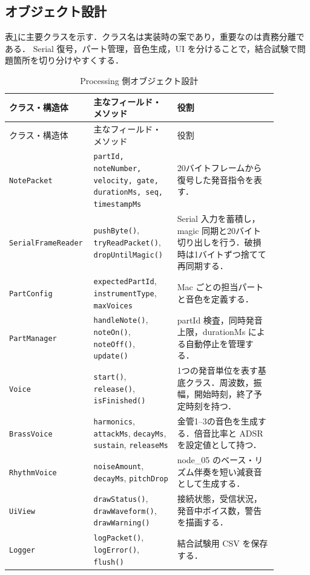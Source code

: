 \documentclass[lualatex,book,openany,paper=a4paper,jafontsize=11.5pt,jafontscale=1.05]{jlreq}
\begin{document}
\subsection{オブジェクト設計}
表\ref{tab:classes}に主要クラスを示す．クラス名は実装時の案であり，重要なのは責務分離である．
Serial 復号，パート管理，音色生成，UI を分けることで，結合試験で問題箇所を切り分けやすくする．

\begin{longtable}{p{0.22\linewidth}p{0.30\linewidth}p{0.36\linewidth}}
\caption{Processing 側オブジェクト設計}\label{tab:classes}\\
\hline
クラス・構造体 & 主なフィールド・メソッド & 役割 \\
\hline
\endfirsthead
\hline
クラス・構造体 & 主なフィールド・メソッド & 役割 \\
\hline
\endhead
\texttt{NotePacket} &
\texttt{partId, noteNumber, velocity, gate, durationMs, seq, timestampMs} &
20バイトフレームから復号した発音指令を表す． \\
\hline
\texttt{SerialFrameReader} &
\texttt{pushByte()}, \texttt{tryReadPacket()}, \texttt{dropUntilMagic()} &
Serial 入力を蓄積し，magic 同期と20バイト切り出しを行う．破損時は1バイトずつ捨てて再同期する． \\
\hline
\texttt{PartConfig} &
\texttt{expectedPartId}, \texttt{instrumentType}, \texttt{maxVoices} &
Mac ごとの担当パートと音色を定義する． \\
\hline
\texttt{PartManager} &
\texttt{handleNote()}, \texttt{noteOn()}, \texttt{noteOff()}, \texttt{update()} &
partId 検査，同時発音上限，durationMs による自動停止を管理する． \\
\hline
\texttt{Voice} &
\texttt{start()}, \texttt{release()}, \texttt{isFinished()} &
1つの発音単位を表す基底クラス．周波数，振幅，開始時刻，終了予定時刻を持つ． \\
\hline
\texttt{BrassVoice} &
\texttt{harmonics}, \texttt{attackMs}, \texttt{decayMs}, \texttt{sustain}, \texttt{releaseMs} &
金管1--3の音色を生成する．倍音比率と ADSR を設定値として持つ． \\
\hline
\texttt{RhythmVoice} &
\texttt{noiseAmount}, \texttt{decayMs}, \texttt{pitchDrop} &
node\_05 のベース・リズム伴奏を短い減衰音として生成する． \\
\hline
\texttt{UiView} &
\texttt{drawStatus()}, \texttt{drawWaveform()}, \texttt{drawWarning()} &
接続状態，受信状況，発音中ボイス数，警告を描画する． \\
\hline
\texttt{Logger} &
\texttt{logPacket()}, \texttt{logError()}, \texttt{flush()} &
結合試験用 CSV を保存する． \\
\hline
\end{longtable}
\end{document}
